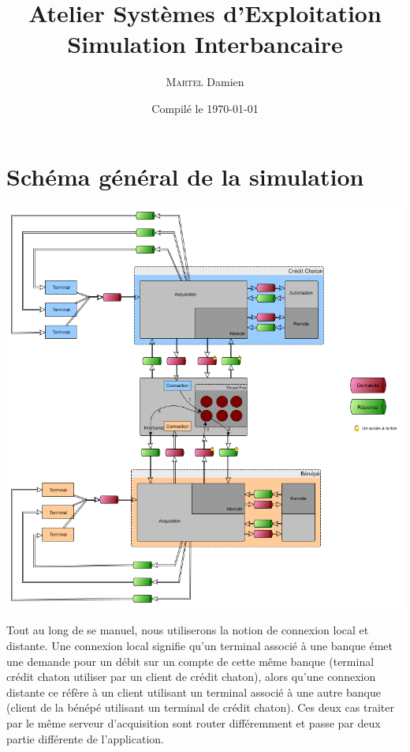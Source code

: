 \documentclass[french, a4paper, 12pt, titlepage]{article}
\begin{document}
\title{Atelier Systèmes d'Exploitation\\Simulation Interbancaire}
\author{\textsc{Martel} Damien}
\date{Compilé le \today}

\maketitle

\vfill
\pagebreak

\newpage
\strut\thispagestyle{empty}
\vfill
\pagebreak
\tableofcontents
\strut\thispagestyle{empty}
\newpage
\setcounter{page}{1}

\section{Schéma général de la simulation}
\medskip
\begin{center}
\includegraphics[scale=0.5]{global}
\end{center}
\medskip

Tout au long de se manuel, nous utiliserons la notion de connexion local et distante.
Une connexion local signifie qu'un terminal associé à une banque émet une demande pour un débit sur un compte de cette même banque (terminal crédit chaton utiliser par un client de crédit chaton), alors qu'une connexion distante ce réfère à un client utilisant un terminal associé à une autre banque (client de la bénépé utilisant un terminal de crédit chaton).
Ces deux cas traiter par le même serveur d'acquisition sont router différemment et passe par deux partie différente de l'application.
\end{document}
